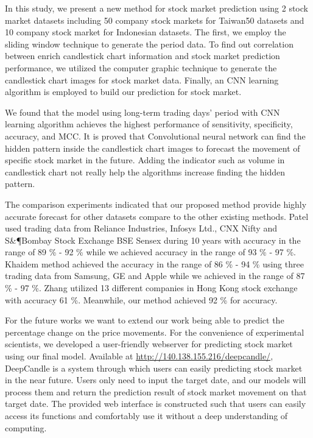 \documentclass[10pt,twocolumn]{article}
\begin{document}
In this study, we present a new method for stock market prediction using 2 stock market datasets including 50 company stock markets for Taiwan50 datasets and 10 company stock market for Indonesian datasets. The first, we employ the sliding window technique to generate the period data. To find out correlation between enrich candlestick chart information and stock market prediction performance, we utilized the computer graphic technique to generate the candlestick chart images for stock market data. Finally, an CNN learning algorithm is employed to build our prediction for stock market.
\par
We found that the model using long-term trading days’ period with CNN learning algorithm achieves the highest performance of sensitivity, specificity, accuracy, and MCC. It is proved that Convolutional neural network can find the hidden pattern inside the candlestick chart images to forecast the movement of specific stock market in the future. Adding the indicator such as volume in candlestick chart not really help the algorithms increase finding the hidden pattern.
\par
The comparison experiments indicated that our proposed method provide highly accurate forecast for other datasets compare to the other existing methods. Patel used trading data from Reliance Industries, Infosys Ltd., CNX Nifty and S\&\P Bombay Stock Exchange BSE Sensex during 10 years with accuracy in the range of 89 \% - 92 \% while we achieved accuracy in the range of 93 \% - 97 \%. Khaidem method achieved the accuracy in the range of 86 \% - 94 \% using three trading data from Samsung, GE and Apple while we achieved in the range of 87 \% - 97 \%. Zhang utilized 13 different companies in Hong Kong stock exchange with accuracy 61 \%. Meanwhile, our method achieved 92 \% for accuracy. 
\par
For the future works we want to extend our work being able to predict the percentage change on the price movements. For the convenience of experimental scientists, we developed a user-friendly webserver for predicting stock market using our final model. Available at \url{http://140.138.155.216/deepcandle/}, DeepCandle is a system through which users can easily predicting stock market in the near future. Users only need to input the target date, and our models will process them and return the prediction result of stock market movement on that target date. The provided web interface is constructed such that users can easily access its functions and comfortably use it without a deep understanding of computing.




\end{document}
